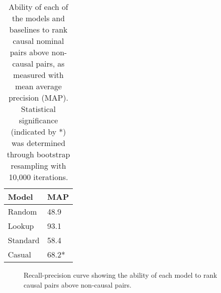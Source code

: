\begin{table}[t!]
\begin{center}
\begin{footnotesize}
\begin{tabular}{ll}
\hline
\multicolumn{1}{l}{ Model } & \multicolumn{1}{l}{MAP} \\ %

\hline
Random 			& 48.9 	\\
Lookup			& 93.1 	\\
Standard  		& 58.4	\\
Casual  			& 68.2*	\\

\end{tabular}
\end{footnotesize}
\caption{{\small Ability of each of the models and baselines to rank causal nominal pairs above non-causal pairs, as measured with mean average precision (MAP). Statistical significance (indicated by *) was determined through bootstrap resampling with 10,000 iterations.}}
\label{tab:MAP}
\end{center}
\end{table}

\begin{figure}[t!]
\begin{center}
\caption{{\small Recall-precision curve showing the ability of each model to rank causal pairs above non-causal pairs. }}
\label{fig:rpcurve_all}
\end{center}
\end{figure}

